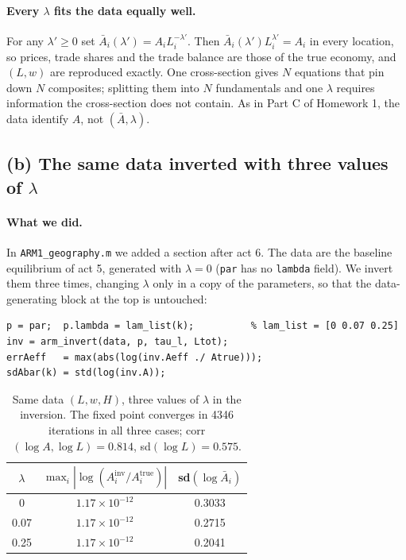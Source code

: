 \documentclass[11pt,a4paper]{article}
\begin{document}
\paragraph{Every $\lambda$ fits the data equally well.} For any $\lambda'\ge0$ set $\bar A_i(\lambda')=A_iL_i^{-\lambda'}$. Then $\bar A_i(\lambda')L_i^{\lambda'}=A_i$ in every location, so prices, trade shares and the trade balance are those of the true economy, and $(L,w)$ are reproduced exactly. One cross-section gives $N$ equations that pin down $N$ composites; splitting them into $N$ fundamentals and one $\lambda$ requires information the cross-section does not contain. As in Part C of Homework 1, the data identify $A$, not $(\bar A,\lambda)$.

\subsection*{(b) The same data inverted with three values of $\lambda$}

\paragraph{What we did.} In \texttt{ARM1\_geography.m} we added a section after act 6. The data are the baseline equilibrium of act 5, generated with $\lambda=0$ (\texttt{par} has no \texttt{lambda} field). We invert them three times, changing $\lambda$ only in a copy of the parameters, so that the data-generating block at the top is untouched:
\begin{verbatim}
p = par;  p.lambda = lam_list(k);          % lam_list = [0 0.07 0.25]
inv = arm_invert(data, p, tau_l, Ltot);
errAeff   = max(abs(log(inv.Aeff ./ Atrue)));
sdAbar(k) = std(log(inv.A));
\end{verbatim}

\begin{table}[h]
\centering
\begin{tabular}{ccc}
\toprule
$\lambda$ & $\max_i|\log(A_i^{\text{inv}}/A_i^{\text{true}})|$ & sd$(\log\bar A_i)$\\
\midrule
0    & $1.17\times10^{-12}$ & 0.3033\\
0.07 & $1.17\times10^{-12}$ & 0.2715\\
0.25 & $1.17\times10^{-12}$ & 0.2041\\
\bottomrule
\end{tabular}
\caption{Same data $(L,w,H)$, three values of $\lambda$ in the inversion. The fixed point converges in 4346 iterations in all three cases; corr$(\log A,\log L)=0.814$, sd$(\log L)=0.575$.}
\end{table}
\end{document}
